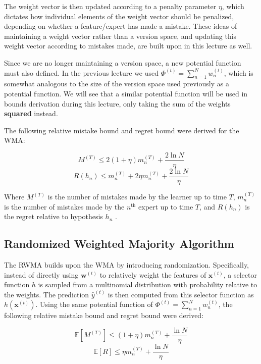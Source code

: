 \documentclass[11pt]{article}
\begin{document}
The weight vector is then updated according to a penalty parameter $\eta$, which dictates how individual elements of the weight vector should be penalized, depending on whether a feature/expert has made a mistake. These ideas of maintaining a weight vector rather than a version space, and updating this weight vector according to mistakes made, are built upon in this lecture as well.

Since we are no longer maintaining a version space, a new potential function must also defined. In the previous lecture we used $\Phi^{(t)} = \sum_{n=1}^{N}w_n^{(t)}$, which is somewhat analogous to the size of the version space used previously as a potential function. We will see that a similar potential function will be used in bounds derivation during this lecture, only taking the sum of the weights \textbf{squared} instead.

The following relative mistake bound and regret bound were derived for the WMA:

$$M^{(T)} \leq 2(1+\eta)m_n^{(T)}+\frac{2\ln N}{\eta}$$
\begin{equation}
R(h_n)\leq m_n^{(T)}+2\eta m_n^{(T)} + \frac{2\ln N}{\eta}
\label{eq:wma-regret}    
\end{equation}

Where $M^{(T)}$ is the number of mistakes made by the learner up to time $T$, $m_n^{(T)}$ is the number of mistakes made by the $n^{\text{th}}$ expert up to time $T$, and $R(h_n)$ is the regret relative to hypothesis $h_n$ \cite{shalev-shwartz} .

\subsection{Randomized Weighted Majority Algorithm}

The RWMA builds upon the WMA by introducing randomization. Specifically, instead of directly using $\boldsymbol{w}^{(t)}$ to relatively weight the features of $\boldsymbol{x}^{(t)}$, a selector function $h$ is sampled from a multinomial distribution with probability relative to the weights. The prediction $\hat{y}^{(t)}$ is then computed from this selector function as $h(\boldsymbol{x}^{(t)})$. Using the same potential function of $\Phi^{(t)} = \sum_{n=1}^{N}w_n^{(t)}$, the following relative mistake bound and regret bound were derived:

$$\mathbb{E}[M^{(T)}]\leq (1+\eta)m_n^{(T)}+\frac{\ln N}{\eta}$$
\begin{equation}
\mathbb{E}[R]\leq \eta m_n^{(T)} + \frac{\ln N}{\eta}
\label{eq:rwma-regret}    
\end{equation}
\end{document}
